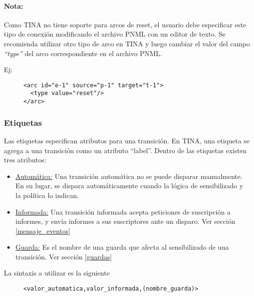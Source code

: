 \begin{framed}
\paragraph{Nota:}
Como TINA no tiene soporte para arcos de reset, el usuario debe especificar
este tipo de conexión modificando el archivo PNML con un editor de texto.
Se recomienda utilizar otro tipo de arco en TINA y luego cambiar el valor del
campo \textit{``type''} del arco correspondiente en el archivo PNML.

Ej:
\begin{figure}[H]
\centering
\begin{verbatim}
<arc id="e-1" source="p-1" target="t-1">
  <type value="reset"/>
</arc>
\end{verbatim}
\end{figure}
\end{framed}

\subsubsection{Etiquetas}

Las etiquetas especifican atributos para una transición. En TINA, una etiqueta
se agrega a una transición como un atributo ``label''.
Dentro de las etiquetas existen tres atributos:

\begin{itemize}
    \item \underline{Automática:} Una transición automática no se puede disparar
    manualmente. En su lugar, se dispara automáticamente cuando la lógica de
    sensibilizado y la política lo indican.
    \item \underline{Informada:} Una transición informada acepta peticiones de
    suscripción a informes, y envía informes a sus suscriptores ante un disparo.
    Ver sección \ref{mensaje_eventos}
    \item \underline{Guarda:} Es el nombre de una guarda que afecta
    al sensibilizado de una transición. Ver sección \ref{guardas}
\end{itemize}

La sintaxis a utilizar es la siguiente

\begin{figure}[H]
\centering
\begin{verbatim}
<valor_automatica,valor_informada,(nombre_guarda)>
\end{verbatim}
\end{figure}

